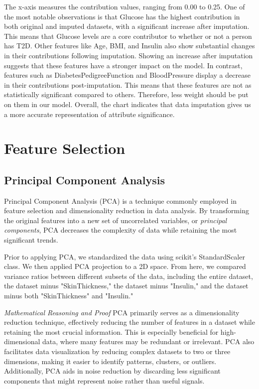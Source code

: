 \documentclass[journal]{IEEEtran}
\begin{document}
The x-axis measures the contribution values, ranging from 0.00 to 0.25. One of the most notable observations is that Glucose has the highest contribution in both original and imputed datasets, with a significant increase after imputation. This means that Glucose levels are a core contributor to whether or not a person has T2D. Other features like Age, BMI, and Insulin also show substantial changes in their contributions following imputation. Showing an increase after imputation suggests that these features have a stronger impact on the model. In contrast, features such as DiabetesPedigreeFunction and BloodPressure display a decrease in their contributions post-imputation. This means that these features are not as statistically significant compared to others. Therefore, less weight should be put on them in our model. Overall, the chart indicates that data imputation gives us a more accurate representation of attribute significance.

\section{Feature Selection}

\subsection{Principal Component Analysis}
Principal Component Analysis (PCA) is a technique commonly employed in feature selection and dimensionality reduction in data analysis. By transforming the original features into a new set of uncorrelated variables, or \textit{principal components}, PCA decreases the complexity of data while retaining the most significant trends.

Prior to applying PCA, we standardized the data using scikit's StandardScaler class. We then applied PCA projection to a 2D space. From here, we compared variance ratios between different subsets of the data, including the entire dataset, the dataset minus "SkinThickness," the dataset minus "Insulin," and the dataset minus both "SkinThickness" and "Insulin."

\emph{Mathematical Reasoning and Proof}
PCA primarily serves as a dimensionality reduction technique, effectively reducing the number of features in a dataset while retaining the most crucial information. This is especially beneficial for high-dimensional data, where many features may be redundant or irrelevant. PCA also facilitates data visualization by reducing complex datasets to two or three dimensions, making it easier to identify patterns, clusters, or outliers. Additionally, PCA aids in noise reduction by discarding less significant components that might represent noise rather than useful signals.
\end{document}
